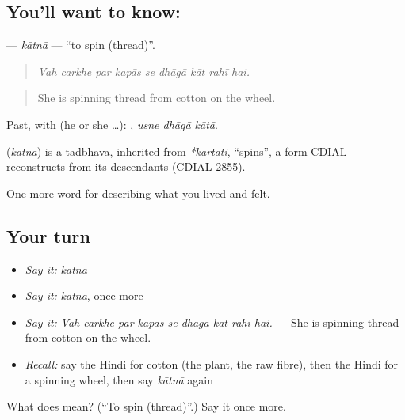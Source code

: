 \subsection*{You'll want to know: }
\textbf{} — \emph{kātnā} — \textquotedblleft{}to spin (thread)\textquotedblright{}.

\begin{quote}
        
\end{quote}

\begin{quote}
\emph{Vah carkhe par kapās se dhāgā kāt rahī hai.}
\end{quote}

\begin{quote}
She is spinning thread from cotton on the wheel.
\end{quote}

Past, with  (he or she …):   , \emph{usne dhāgā kātā}.

\begin{cousinweb}
\textbf{} (\emph{kātnā}) is a tadbhava, inherited from \emph{*kartati}, \textquotedblleft{}spins\textquotedblright{}, a form CDIAL reconstructs from its descendants (CDIAL 2855).
\end{cousinweb}

\begin{grammarlens}[title={What you've built}]
One more word for describing what you lived and felt.
\end{grammarlens}

\subsection*{Your turn}
\begin{itemize}
\raggedright
  \item \emph{Say it:} \emph{kātnā}
  \item \emph{Say it:} \emph{kātnā}, once more
  \item \emph{Say it:} \emph{Vah carkhe par kapās se dhāgā kāt rahī hai.} — She is spinning thread from cotton on the wheel.
  \item \emph{Recall:} say the Hindi for cotton (the plant, the raw fibre), then the Hindi for a spinning wheel, then say \emph{kātnā} again
\end{itemize}

\begin{tcolorbox}[breakable,colback=teal!4,colframe=teal!35!black,title={Before you move on}]
What does  mean? (\textquotedblleft{}To spin (thread)\textquotedblright{}.) Say it once more.
\end{tcolorbox}

